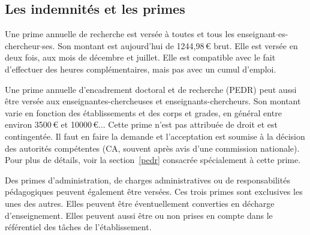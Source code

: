 \begin{center}
\begin{table}
\begin{center}
\caption{Grilles d'avancement des EC}\label{tab.avanc}
\end{center}
\end{table}
\end{center}

\vskip -3cm

\subsection{Les indemnit\'es et les primes}

Une prime annuelle de recherche est vers\'ee \`a toutes et tous les
enseignant$\cdot$es-chercheur$\cdot$ses. Son montant est aujourd'hui de
1244,98\,\euro{} brut. Elle est vers\'ee en deux fois, aux mois de
d\'ecembre et juillet. Elle est compatible avec le fait d'effectuer
des heures compl\'ementaires, mais pas avec un cumul d'emploi.

Une prime annuelle d'encadrement doctoral et de recherche (PEDR)
peut aussi \^etre vers\'ee aux enseignantes-chercheuses et enseignants-chercheurs. Son montant
varie en fonction des \'etablissements et des corps et grades, en g\'en\'eral entre
environ 3500\,\euro{}  et
10000\,\euro{}... Cette prime n'est
pas attribu\'ee de droit et est contingent\'ee. Il faut en faire la
demande et l'acceptation est soumise \`a la d\'ecision des
autorit\'es comp\'etentes (CA, souvent apr\`es avis d'une commission nationale).
Pour plus de d\'etails, voir la
section~\ref{pedr}
consacr\'ee sp\'ecialement \`a cette prime.

Des primes d'administration, de charges administratives ou de
responsabilit\'es p\'edagogiques peuvent \'egalement \^etre
vers\'ees. Ces trois primes sont exclusives les unes des autres.
Elles peuvent \^etre \'even\-tuel\-lement converties en d\'echarge d'enseignement. Elles peuvent
aussi \^etre ou non prises en compte dans le r\'ef\'erentiel des t\^aches de l'\'etablissement.

